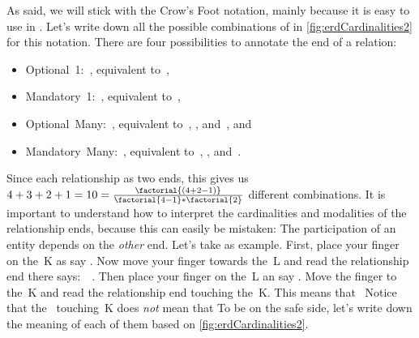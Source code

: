 As said, we will stick with the Crow's Foot notation, mainly because it is easy to use in \yEd.
Let's write down all the possible combinations of  in \cref{fig:erdCardinalities2} for this notation.
There are four possibilities to annotate the end of a relation:%
\begin{itemize}%
\item Optional~1:~\crowsFootOptionalOne, equivalent to~,%
\item Mandatory~1:~\crowsFootMandatoryOne, equivalent to~,%
\item Optional~Many:~\crowsFootOptionalMany, equivalent to~, , and~, and%
\item Mandatory~Many:~\crowsFootMandatoryMany, equivalent to~, , and~.%
\end{itemize}%
%
Since each relationship as two ends, this gives us $4+3+2+1=10=\frac{\factorial{(4+2-1)}}{\factorial{4-1}*\factorial{2}}$ different combinations.
It is important to understand how to interpret the cardinalities and modalities of the relationship ends, because this can easily be mistaken:
The participation of an entity depends on the \emph{other} end.
Let's take  as example.
First, place your finger on the~K as say .
Now move your finger towards the~L and read the relationship end there says:~~\cite{SE:DA:2016HDIRENCFTCTNL}.
Then place your finger on the~L an say .
Move the finger to the~K and read the relationship end touching the~K.
This means that~
Notice that the \crowsFootMandatoryOne\ touching~K does \emph{not} mean that 
To be on the safe side, let's write down the meaning of each of them based on \cref{fig:erdCardinalities2}.%
%
